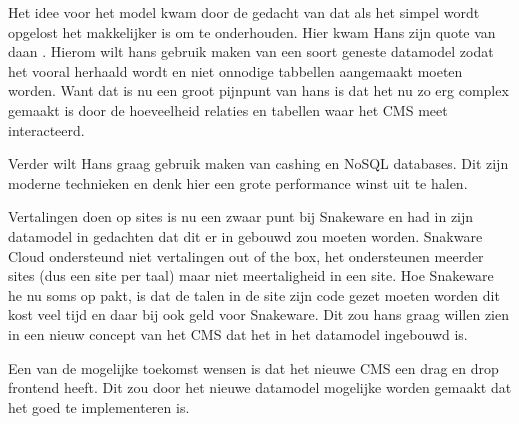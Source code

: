 \whitespace
Het idee voor het model kwam door de gedacht van dat als het simpel wordt opgelost het makkelijker is om te onderhouden.
Hier kwam Hans zijn quote van daan .
Hierom wilt hans gebruik maken van een soort geneste datamodel zodat het vooral herhaald wordt en niet onnodige tabbellen aangemaakt moeten worden.
Want dat is nu een groot pijnpunt van hans is dat het nu zo erg complex gemaakt is door de hoeveelheid relaties en tabellen waar het CMS meet interacteerd.

\whitespace
Verder wilt Hans graag gebruik maken van cashing en NoSQL databases.
Dit zijn moderne technieken en denk hier een grote performance winst uit te halen.

\whitespace
Vertalingen doen op sites is nu een zwaar punt bij Snakeware en had in zijn datamodel in gedachten dat dit er in gebouwd zou moeten worden.
Snakware Cloud ondersteund niet vertalingen out of the box, het ondersteunen meerder sites (dus een site per taal) maar niet meertaligheid in een site.
Hoe Snakeware he nu soms op pakt, is dat de talen in de site zijn code gezet moeten worden dit kost veel tijd en daar bij ook geld voor Snakeware.
Dit zou hans graag willen zien in een nieuw concept van het CMS dat het in het datamodel ingebouwd is. 

\whitespace
Een van de mogelijke toekomst wensen is dat het nieuwe CMS een drag en drop frontend heeft.
Dit zou door het nieuwe datamodel mogelijke worden gemaakt dat het goed te implementeren is.

